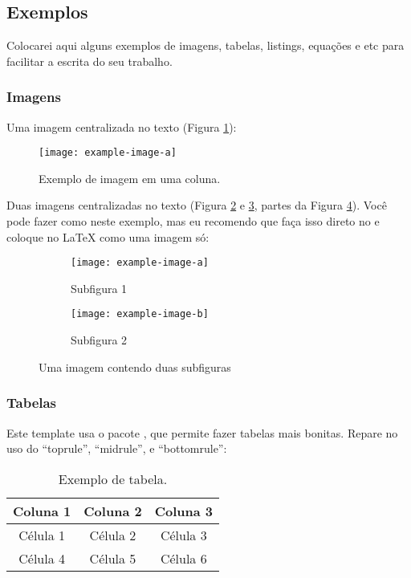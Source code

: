     \subsection{Exemplos}
      Colocarei aqui alguns exemplos de imagens, tabelas, listings, equações e etc para facilitar a escrita do seu trabalho.

      \subsubsection{Imagens}
      Uma imagem centralizada no texto (Figura \ref{fig:ex_1col}):
      \begin{figure}[h]
        \centering
        \texttt{[image: example-image-a]}
        \caption{Exemplo de imagem em uma coluna.}
        \label{fig:ex_1col}
      \end{figure}

      Duas imagens centralizadas no texto (Figura \ref{fig:sub_1} e \ref{fig:sub_2}, partes da Figura \ref{fig:ex_2cols}). Você pode fazer como neste exemplo, mas eu recomendo que faça isso direto no  e coloque no \LaTeX{} como uma imagem só:
      \begin{figure}[h]
        \centering
        \begin{subfigure}{.45\textwidth}
          \centering
          \texttt{[image: example-image-a]}
          \caption{Subfigura 1}
          \label{fig:sub_1}
        \end{subfigure}%
        \begin{subfigure}{.45\textwidth}
          \centering
          \texttt{[image: example-image-b]}
          \caption{Subfigura 2}
          \label{fig:sub_2}
        \end{subfigure}
        \caption{Uma imagem contendo duas subfiguras}
        \label{fig:ex_2cols}
      \end{figure}
      
      \subsubsection{Tabelas}
        Este template usa o pacote , que permite fazer tabelas mais bonitas. Repare no uso do ``toprule'', ``midrule'', e ``bottomrule'':
        \begin{table}[h!]
          \centering
          \caption{Exemplo de tabela.}
          \label{tab:ex_1}
          \begin{tabular}{ccc}
            \toprule
            \textbf{Coluna 1} & \textbf{Coluna 2} & \textbf{Coluna 3} \\ \midrule
            Célula 1          & Célula 2          & Célula 3          \\ 
            Célula 4          & Célula 5          & Célula 6          \\ 
            \bottomrule
          \end{tabular}
        \end{table}

